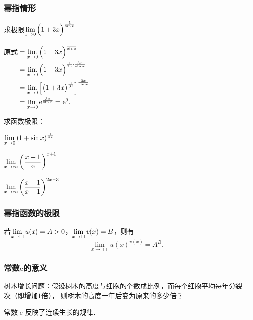 \documentclass[14pt,notheorems,leqno,xcolor={rgb}]{beamer} %
\begin{document}
\begin{frame}
\frametitle{幂指情形}
\begin{example}
求极限$\lim\limits_{x\to0}\Big(1+3x\Big)^{\frac1{\sin x}}$
\end{example}
\pause
\begin{solution}
原式\noindent$\begin{aligned}[t]
&=\lim_{x\to0}\Big(1+3x\Big)^{\frac1{\sin x}}\\
&=\lim_{x\to0}\Big(1+3x\Big)^{\frac1{3x}\cdot\frac{3x}{\sin x}}\\
&=\lim_{x\to0}\left[\big(1+3x\big)^{\frac1{3x}}\right]^{\frac{3x}{\sin x}}\\
&=\lim_{x\to0}\mathrm{e}^{\frac{3x}{\sin x}}=\mathrm{e}^3.
\end{aligned}$
\end{solution}
\end{frame}

\begin{frame}
\begin{exercise}求函数极限：
\begin{enumlite}
  \item $\lim\limits_{x\to0}\left(1+\sin x\right)^{\frac1{4x}}$
  \item $\lim\limits_{x\to\infty}\left(\dfrac{x-1}x\right)^{x+1}$
  \pause
  \item $\lim\limits_{x\to\infty}\left(\dfrac{x+1}{x-1}\right)^{2x-3}$
\end{enumlite}
\end{exercise}
\end{frame}

\begin{jframe}
\frametitle{幂指函数的极限}
\begin{theorem*}
若$\lim\limits_{x\to\Box}u(x)=A>0$，$\lim\limits_{x\to\Box}v(x)=B$，则有
\[ \lim_{x\to\Box}u(x)^{v(x)}=A^B.\]
\end{theorem*}
\end{jframe}

\begin{rframe}
\frametitle{常数$\mathrm{e}$的意义}
\begin{example*}
树木增长问题：假设树木的高度与细胞的个数成比例，而每个细胞平均每年分裂一次（即增加$1$倍），
则树木的高度一年后变为原来的多少倍？\pause\dotfill[$\e$倍]
\end{example*}\pause
\begin{fact*}
常数 $\mathrm{e}$ 反映了连续生长的规律．
\end{fact*}
\end{rframe}
\end{document}
